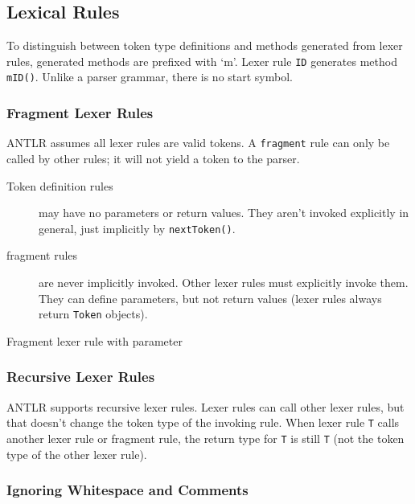 \subsection{Lexical Rules}

To distinguish between token type definitions
and methods generated from lexer rules,
generated methods are prefixed with `m'.
Lexer rule \verb-ID- generates method \verb-mID()-.
Unlike a parser grammar, there is no start symbol.

\subsubsection{Fragment Lexer Rules}

ANTLR assumes all lexer rules are valid tokens.
A \verb=fragment= rule can only be called by other rules;
it will not yield a token to the parser.

\begin{description}
\item[Token definition rules]
may have no parameters or return values.
They aren't invoked explicitly in general,
just implicitly by \verb=nextToken()=.

\item[fragment rules]
are never implicitly invoked.
Other lexer rules must explicitly invoke them.
They can define parameters, but not return values
(lexer rules always return \verb=Token= objects).
\end{description}

\begin{program}
\caption{Fragment lexer rule with parameter\label{gram:fragment-lexer-param}}
\end{program}

\subsubsection{Recursive Lexer Rules}

ANTLR supports recursive lexer rules.
Lexer rules can call other lexer rules,
but that doesn't change the token type of the invoking rule.
When lexer rule \verb=T= calls another lexer rule or fragment rule,
the return type for \verb.T. is still \verb.T.
(not the token type of the other lexer rule).

\subsubsection{Ignoring Whitespace and Comments}

